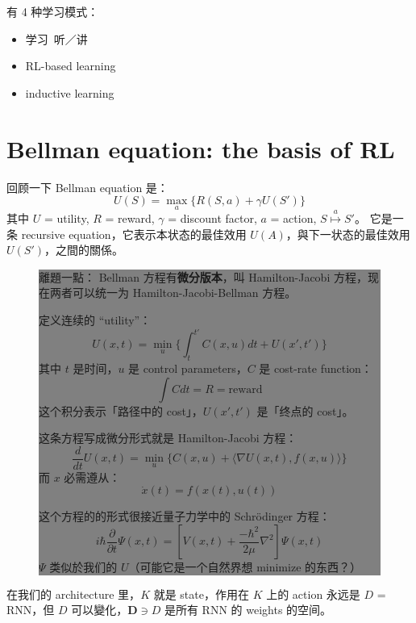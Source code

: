\documentclass[12pt]{article}
\begin{document}
有 4 种学习模式：
\begin{itemize}
\item 学习~听／讲
\item RL-based learning
\item inductive learning
\end{itemize}

\section{Bellman equation: the basis of RL}

回顾一下 Bellman equation 是：
$$ U(S) = \max_a \{ R(S,a) + \gamma U(S') \}$$
其中 $U$ = utility, $R$ = reward, $\gamma$ = discount factor, $a$ = action, $S \stackrel{a}{\mapsto} S'$。 它是一条 recursive equation，它表示本状态的最佳效用  $U(A)$，與下一状态的最佳效用 $U(S')$，之間的關係。

\begin{figure}[!h!t!b!p]
\begin{center}
\colorbox{grey}{\parbox{0.95\textwidth}{\setlength{\parskip}{2.5ex}
離題一點： Bellman 方程有\textbf{微分版本}，叫 Hamilton-Jacobi 方程，现在两者可以统一为 Hamilton-Jacobi-Bellman 方程。

定义连续的 ``utility''：
$$ U(x,t) = \min_u \{ \int_t^{t'} C(x,u)dt + U(x',t') \} $$
其中 $t$ 是时间，$u$ 是 control parameters，$C$ 是 cost-rate function：
$$ \int C dt = R = \mbox{reward} $$
这个积分表示「路径中的 cost」，$U(x',t')$ 是「终点的 cost」。

这条方程写成微分形式就是 Hamilton-Jacobi 方程：
$$ \frac{d}{dt} U(x,t) = \min_u \{ C(x,u) + \langle \nabla U(x,t), f(x,u) \rangle \} $$
而 $x$ 必需遵从：
$$ \dot{x}(t) = f(x(t),u(t)) $$

这个方程的的形式很接近量子力学中的 Schr\"{o}dinger 方程：
$$ i \hbar \frac{\partial}{\partial t} \Psi(x,t) = \left[ V(x,t) + \frac{-\hbar^2}{2\mu} \nabla^2 \right] \Psi(x,t) $$
$\Psi$ 类似於我们的 $U$（可能它是一个自然界想 minimize 的东西？）
}}
\end{center}
\end{figure}


在我们的 architecture 里，$K$ 就是 state，作用在 $K$ 上的 action 永远是 $D$ = RNN，但 $D$ 可以變化，$\mathbf{D} \ni D$ 是所有 RNN 的 weights 的空间。 
\end{document}
